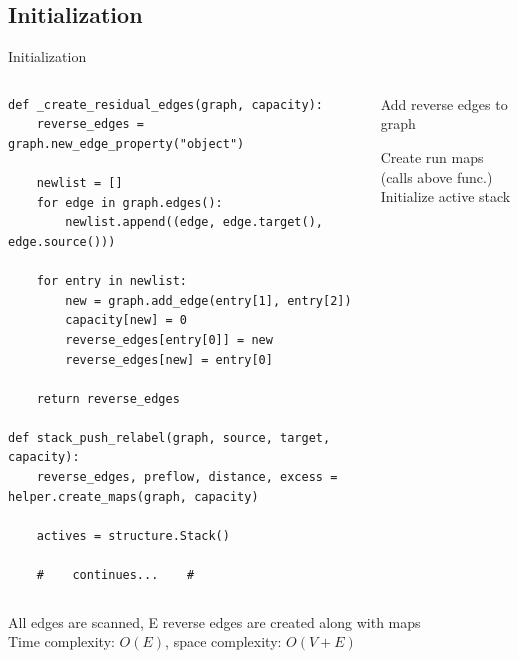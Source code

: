 \documentclass{beamer}
\begin{document}
\subsection{Initialization}
\begin{frame}[fragile]{Initialization}
    \begin{columns}[T]
        \begin{column}{0.50\textwidth}
            \begin{lstlisting}
def _create_residual_edges(graph, capacity):
    reverse_edges = graph.new_edge_property("object")

    newlist = []
    for edge in graph.edges():
        newlist.append((edge, edge.target(), edge.source()))

    for entry in newlist:
        new = graph.add_edge(entry[1], entry[2])
        capacity[new] = 0
        reverse_edges[entry[0]] = new
        reverse_edges[new] = entry[0]

    return reverse_edges

def stack_push_relabel(graph, source, target, capacity):
    reverse_edges, preflow, distance, excess = helper.create_maps(graph, capacity)

    actives = structure.Stack()

    #    continues...    #
            \end{lstlisting}
        \end{column}

        \begin{column}{0.50\textwidth}
            \begin{sidecomment}
                \pause
                \vskip 75bp
                Add reverse edges to graph

                \pause
                \vskip 40bp
                Create run maps (calls above func.)
                \\Initialize active stack
            \end{sidecomment}
        \end{column}
    \end{columns}

    \pause
    \vspace*{\fill}
    All edges are scanned, E reverse edges are created along with maps
    \\Time complexity: $O(E)$, space complexity: $O(V+E)$
\end{frame}
\end{document}
